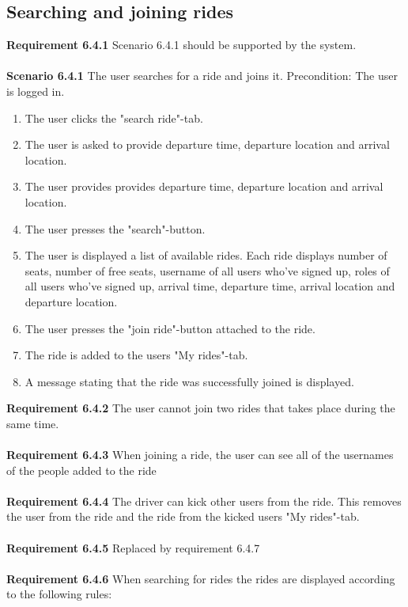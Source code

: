 \documentclass{article}
\begin{document}
\subsection{Searching and joining rides}
\textbf{Requirement 6.4.1} Scenario 6.4.1 should be supported by the system.
\\ \\
\textbf{Scenario 6.4.1} The user searches for a ride and joins it. Precondition: The user is logged in.
\begin{enumerate}
    \item The user clicks the "search ride"-tab.
    \item The user is asked to provide departure time, departure location and arrival location. 
    \item The user provides provides departure time, departure location and arrival location.
    \item The user presses the "search"-button.
    \item The user is displayed a list of available rides. Each ride displays number of seats, number of free seats, username of all users who've signed up, roles of all users who've signed up, arrival time, departure time, arrival location and departure location.  
    \item The user presses the "join ride"-button attached to the ride.
    \item The ride is added to the users "My rides"-tab.
    \item A message stating that the ride was successfully joined is displayed.
\end{enumerate}
\textbf{Requirement 6.4.2} The user cannot join two rides that takes place during the same time.
\\ \\
\textbf{Requirement 6.4.3} When joining a ride, the user can see all of the usernames of the people added to the ride
\\ \\
\textbf{Requirement 6.4.4} The driver can kick other users from the ride. This removes the user from the ride and the ride from the kicked users "My rides"-tab.
\\ \\
\textbf{Requirement 6.4.5} Replaced by requirement 6.4.7
\\ \\
\textbf{Requirement 6.4.6} When searching for rides the rides are displayed according to the following rules:
\end{document}
